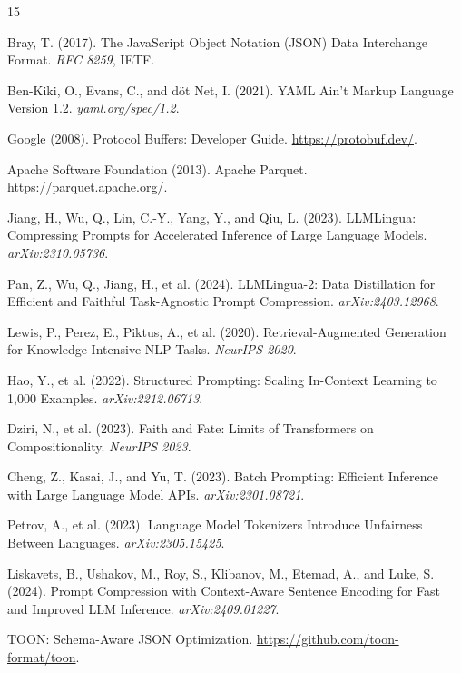 \documentclass[10pt,twocolumn]{article}
\begin{document}

\begin{thebibliography}{15}
\small

Bray, T. (2017).
The JavaScript Object Notation (JSON) Data Interchange Format.
\emph{RFC 8259}, IETF.

Ben-Kiki, O., Evans, C., and döt Net, I. (2021).
YAML Ain't Markup Language Version 1.2.
\emph{yaml.org/spec/1.2}.

Google (2008).
Protocol Buffers: Developer Guide.
\url{https://protobuf.dev/}.

Apache Software Foundation (2013).
Apache Parquet.
\url{https://parquet.apache.org/}.

Jiang, H., Wu, Q., Lin, C.-Y., Yang, Y., and Qiu, L. (2023).
LLMLingua: Compressing Prompts for Accelerated Inference of Large Language Models.
\emph{arXiv:2310.05736}.

Pan, Z., Wu, Q., Jiang, H., et al. (2024).
LLMLingua-2: Data Distillation for Efficient and Faithful Task-Agnostic Prompt Compression.
\emph{arXiv:2403.12968}.

Lewis, P., Perez, E., Piktus, A., et al. (2020).
Retrieval-Augmented Generation for Knowledge-Intensive NLP Tasks.
\emph{NeurIPS 2020}.

Hao, Y., et al. (2022).
Structured Prompting: Scaling In-Context Learning to 1,000 Examples.
\emph{arXiv:2212.06713}.

Dziri, N., et al. (2023).
Faith and Fate: Limits of Transformers on Compositionality.
\emph{NeurIPS 2023}.

Cheng, Z., Kasai, J., and Yu, T. (2023).
Batch Prompting: Efficient Inference with Large Language Model APIs.
\emph{arXiv:2301.08721}.

Petrov, A., et al. (2023).
Language Model Tokenizers Introduce Unfairness Between Languages.
\emph{arXiv:2305.15425}.

Liskavets, B., Ushakov, M., Roy, S., Klibanov, M., Etemad, A., and Luke, S. (2024).
Prompt Compression with Context-Aware Sentence Encoding for Fast and Improved LLM Inference.
\emph{arXiv:2409.01227}.

TOON: Schema-Aware JSON Optimization.
\url{https://github.com/toon-format/toon}.

\end{thebibliography}
\end{document}
